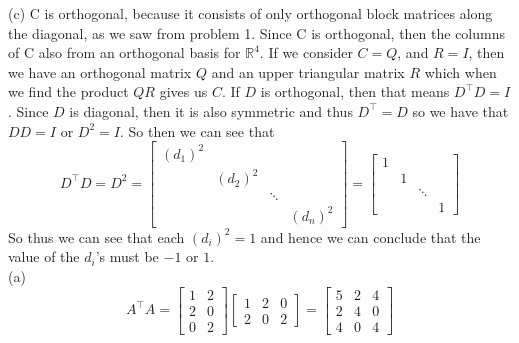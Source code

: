 \documentclass{report}
\begin{document}
(c) C is orthogonal, because it consists of only orthogonal block matrices along the diagonal,  as we saw from problem 1. Since C is orthogonal, then the columns of C also from an orthogonal basis for $\mathbb{R}^4$. If we consider $C = Q$, and $R = I$, then we have an orthogonal matrix $Q$ and an upper triangular matrix $R$ which when we find the product $QR$ gives us $C$.
\newpage
{}
\sol If $D$ is orthogonal, then that means $D^\top D=I$. Since $D$ is diagonal, then it is also symmetric and thus $D^\top = D$ so we have that $DD=I$ or $D^2 = I$. So then we can see that 
$$
D^\top D = D^2 = \begin{bmatrix}
(d_1)^2&&&\\
&(d_2)^2&&\\
&&\ddots&\\
&&&(d_n)^2
\end{bmatrix} = \begin{bmatrix}
1&&&\\
&1&&\\
&&\ddots&\\
&&&1
\end{bmatrix}
$$
So thus we can see that each $(d_i)^2 = 1$ and hence we can conclude that the value of the $d_i$'s must be $-1$ or $1$.
\sol \\
(a)
$$
A^\top A = \begin{bmatrix}
1&2\\
2&0\\
0&2
\end{bmatrix} \begin{bmatrix}
1&2&0\\
2&0&2
\end{bmatrix} = \begin{bmatrix}
5&2&4\\
2&4&0\\
4&0&4
\end{bmatrix}
$$
\end{document}
